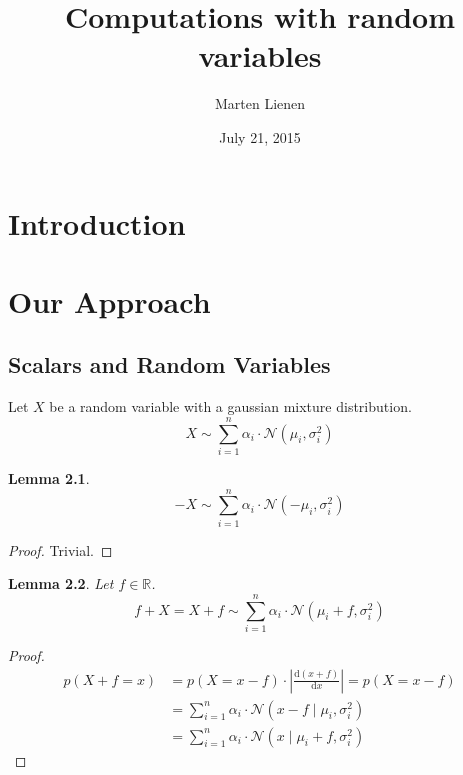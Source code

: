 \documentclass[11pt,a4paper]{report}
\author{Marten Lienen}
\date{July 21, 2015}
\title{Computations with random variables}
\newtheorem{lemma}{Lemma}
\begin{document}
\maketitle

\chapter{Introduction}

\chapter{Our Approach}


\section{Scalars and Random Variables}

Let $X$ be a random variable with a gaussian mixture distribution.
\begin{equation*}
  X \sim \sum_{i = 1}^{n} \alpha_{i} \cdot \mathcal{N}(\mu_{i}, \sigma_{i}^{2})
\end{equation*}

\begin{lemma}
  \begin{equation*}
    -X \sim \sum_{i = 1}^{n} \alpha_{i} \cdot \mathcal{N}(-\mu_{i}, \sigma_{i}^{2})
  \end{equation*}
\end{lemma}

\begin{proof}
  Trivial.
\end{proof}

\begin{lemma}
  Let $f \in \mathbb{R}$.
  \begin{equation*}
    f + X = X + f \sim \sum_{i = 1}^{n} \alpha_{i} \cdot \mathcal{N}(\mu_{i} + f, \sigma_{i}^{2})
  \end{equation*}
\end{lemma}

\begin{proof}
  \begin{align*}
    p(X + f = x) & = p(X = x - f) \cdot \left| \frac{\mathrm{d}(x + f)}{\mathrm{d}x} \right| = p(X = x - f)\\
                 & = \sum_{i = 1}^{n} \alpha_{i} \cdot \mathcal{N}(x - f \mid \mu_{i}, \sigma_{i}^{2})\\
                 & = \sum_{i = 1}^{n} \alpha_{i} \cdot \mathcal{N}(x \mid \mu_{i} + f, \sigma_{i}^{2})
  \end{align*}
\end{proof}
\end{document}
